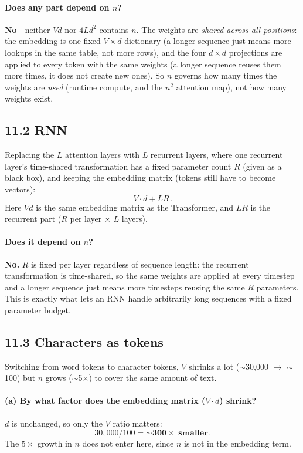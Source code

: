 \documentclass[11pt]{article}
\begin{document}
\paragraph{Does any part depend on $n$?}
\textbf{No} - neither $V d$ nor $4Ld^2$ contains $n$. The weights are
\emph{shared across all positions}: the embedding is one fixed $V \times d$
dictionary (a longer sequence just means more lookups in the same table, not
more rows), and the four $d \times d$ projections are applied to every token
with the same weights (a longer sequence reuses them more times, it does not
create new ones). So $n$ governs how many times the weights are \emph{used}
(runtime compute, and the $n^2$ attention map), not how many weights exist.

\subsection*{11.2 \quad RNN}

Replacing the $L$ attention layers with $L$ recurrent layers, where one
recurrent layer's time-shared transformation has a fixed parameter count $R$
(given as a black box), and keeping the embedding matrix (tokens still have to
become vectors):
\[
\boxed{\,V \cdot d + L R\,}.
\]
Here $V d$ is the same embedding matrix as the Transformer, and $LR$ is the
recurrent part ($R$ per layer $\times$ $L$ layers).

\paragraph{Does it depend on $n$?}
\textbf{No.} $R$ is fixed per layer regardless of sequence length: the recurrent
transformation is time-shared, so the same weights are applied at every
timestep and a longer sequence just means more timesteps reusing the same $R$
parameters. This is exactly what lets an RNN handle arbitrarily long sequences
with a fixed parameter budget.

\subsection*{11.3 \quad Characters as tokens}

Switching from word tokens to character tokens, $V$ shrinks a lot
($\sim$30{,}000 $\to$ $\sim$100) but $n$ grows ($\sim$5$\times$) to cover the
same amount of text.

\paragraph{(a) By what factor does the embedding matrix ($V \cdot d$) shrink?}
$d$ is unchanged, so only the $V$ ratio matters:
\[
30{,}000 / 100 = \textbf{\(\sim\)300\(\times\) smaller}.
\]
The $5\times$ growth in $n$ does not enter here, since $n$ is not in the
embedding term.
\end{document}

